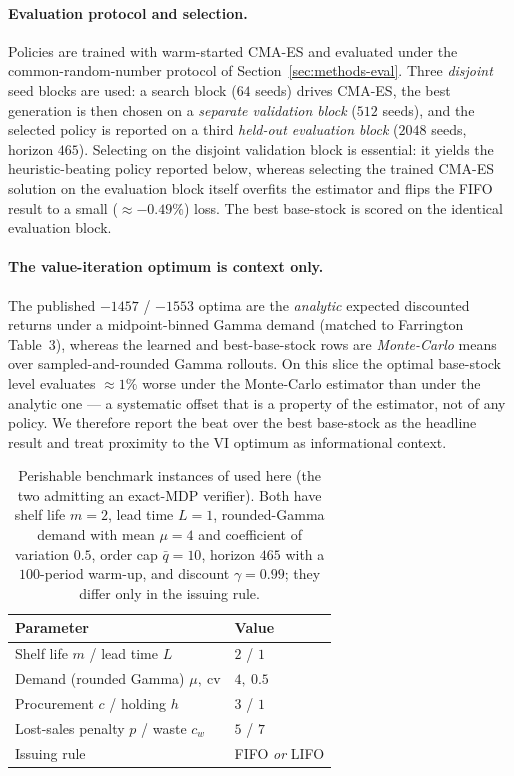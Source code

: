 \documentclass[11pt]{article}
\begin{document}
\paragraph{Evaluation protocol and selection.}
Policies are trained with warm-started CMA-ES and evaluated under the common-random-number protocol of
Section~\ref{sec:methods-eval}. Three \emph{disjoint} seed blocks are used: a search block ($64$
seeds) drives CMA-ES, the best generation is then chosen on a \emph{separate validation block} ($512$
seeds), and the selected policy is reported on a third \emph{held-out evaluation block} ($2048$ seeds,
horizon $465$). Selecting on the disjoint validation block is essential: it yields the heuristic-beating
policy reported below, whereas selecting the trained CMA-ES solution on the evaluation block itself overfits the
estimator and flips the FIFO result to a small ($\approx-0.49\%$) loss. The best base-stock is scored
on the identical evaluation block.

\paragraph{The value-iteration optimum is context only.}
The published $-1457$ / $-1553$ optima are the \emph{analytic} expected discounted returns under a
midpoint-binned Gamma demand (matched to Farrington Table~3), whereas the learned and best-base-stock rows are
\emph{Monte-Carlo} means over sampled-and-rounded Gamma rollouts. On this slice the optimal base-stock
level evaluates $\approx1\%$ worse under the Monte-Carlo estimator than under the analytic one --- a
systematic offset that is a property of the estimator, not of any policy. We therefore report the
beat over the best base-stock as the headline result and treat proximity to the VI optimum as informational context.

\begin{table}[!htbp]
\centering
\caption{Perishable benchmark instances of \citet{deMoor2022perishable} used here (the two
admitting an exact-MDP verifier). Both have shelf life $m=2$, lead time $L=1$, rounded-Gamma demand with
mean $\mu=4$ and coefficient of variation $0.5$, order cap $\bar q=10$, horizon $465$ with a
$100$-period warm-up, and discount $\gamma=0.99$; they differ only in the issuing rule.}
\label{tab:perish-params}
\begin{tabular}{ll}
\toprule
Parameter & Value \\
\midrule
Shelf life $m$ / lead time $L$ & $2$ / $1$ \\
Demand (rounded Gamma) $\mu,\ \mathrm{cv}$ & $4,\ 0.5$ \\
Procurement $c$ / holding $h$ & $3$ / $1$ \\
Lost-sales penalty $p$ / waste $c_w$ & $5$ / $7$ \\
Issuing rule & FIFO \emph{or} LIFO \\
\bottomrule
\end{tabular}
\end{table}
\FloatBarrier
\end{document}
